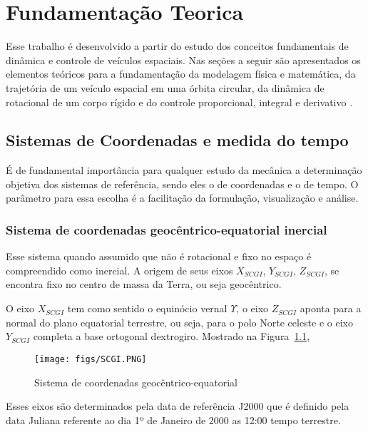 \chapter{Fundamentação Teorica}\label{cap:Fundamentação Teorica}

Esse trabalho é desenvolvido a partir  do estudo dos conceitos fundamentais de dinâmica e controle de veículos espaciais. Nas seções a seguir são apresentados os elementos teóricos para a fundamentação da modelagem física e matemática, da trajetória de um veículo espacial em uma órbita circular, da dinâmica de rotacional de um corpo rígido e do controle proporcional, integral e derivativo .

\section{Sistemas de Coordenadas e medida do tempo}

É de fundamental importância para qualquer estudo da mecânica a determinação objetiva dos sistemas de referência, sendo eles o de coordenadas e o de tempo. O parâmetro para essa escolha é a facilitação da formulação, visualização e análise.  

\subsection{Sistema de coordenadas geocêntrico-equatorial inercial }

Esse sistema quando assumido que não é rotacional e fixo no espaço é compreendido como inercial. A origem de seus eixos $X_{SCGI}$, $Y_{SCGI}$, $Z_{SCGI}$, se encontra fixo no centro de massa da Terra, ou seja geocêntrico.

O eixo $X_{SCGI}$ tem como sentido o equinócio vernal $\Upsilon$, o eixo $Z_{SCGI}$ aponta para a normal do plano equatorial terrestre, ou seja, para o polo Norte celeste e o eixo $Y_{SCGI}$ completa a base ortogonal dextrogiro. Mostrado na Figura~\ref{fig:log}, 

\begin{figure}[htpb]
   \center
   \texttt{[image: figs/SCGI.PNG]}
   \caption{Sistema de coordenadas geocêntrico-equatorial}
   \label{fig:log}
\end{figure}

Esses eixos são determinados pela data de referência J2000 que é definido pela data Juliana referente ao dia 1º de Janeiro de 2000 as 12:00 tempo terrestre.

